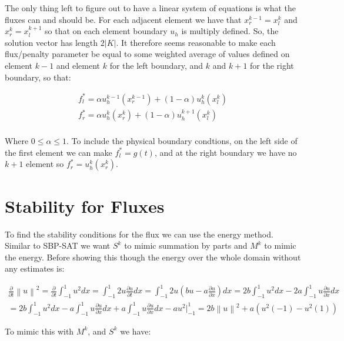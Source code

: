 \documentclass{article}
\newcommand{\norm}[1]{\left\lVert#1\right\rVert}
\begin{document}
\noindent The only thing left to figure out to have a linear system of equations is what the fluxes can and should be. For each adjacent element we have that $x^{k-1}_r = x^k_l$ and $x^k_r = x^{k+1}_l$ so that on each element boundary $u_h$ is multiply defined. So, the solution vector has length $2|K|$. It therefore seems reasonable to make each flux/penalty parameter be equal to some weighted average of values defined on element $k-1$ and element $k$ for the left boundary, and $k$ and $k+1$ for the right boundary, so that:

\begin{gather*}
  f^*_l = \alpha u_h^{k-1}(x^{k-1}_r) + (1-\alpha)u_h^k(x^k_l)\\
  f^*_r = \alpha u_h^{k}(x^{k}_r) + (1-\alpha)u_h^{k+1}(x^k_l)\\
\end{gather*}

Where $0 \leq\alpha \leq 1$. To include the physical boundary condtions, on the left side of the first element we can make $f^*_l = g(t)$, and at the right boundary we have no $k+1$ element so $f^*_r = u_h^k(x_r^k)$.

\section{Stability for Fluxes}

To find the stability conditions for the flux we can use the energy method. Similar to SBP-SAT we want $S^k$ to mimic summation by parts and $M^k$ to mimic the energy. Before showing this though the energy over the whole domain without any estimates is:

\begin{gather*}
  \frac{\partial}{\partial t} \norm{u}^2 =  \frac{\partial}{\partial t} \int_{-1}^1 u^2 dx = \int_{-1}^1 2u\frac{\partial u}{\partial t} dx = \int_{-1}^1 2u\left(bu-a\frac{\partial u}{\partial x}\right) dx = 2b\int_{-1}^1 u^2 dx - 2a\int_{-1}^1 u\frac{\partial u }{\partial x} dx \\
  =  2b\int_{-1}^1 u^2 dx - a\int_{-1}^1 u\frac{\partial u }{\partial x} dx + a\int_{-1}^1 u\frac{\partial u }{\partial x} dx - au^2\biggr\rvert_{-1}^1 = 2b\norm{u}^2 + a(u^2(-1) - u^2(1))
\end{gather*}

\newpage

\noindent To mimic this with $M^k$, and $S^k$ we have:
\end{document}
